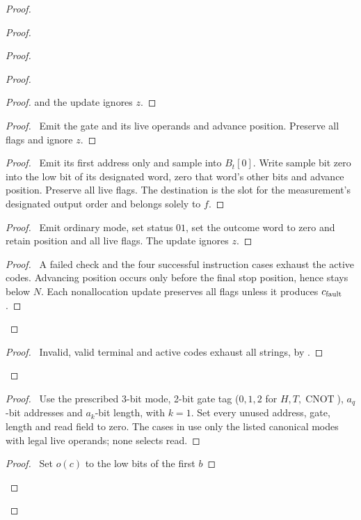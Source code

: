 \begin{proof}
\begin{proof}
\begin{proof}
\begin{proof}
\begin{proof}
   and the update ignores $z$.\end{proof}
   \begin{proof}\pf\ Emit the gate and its live operands and
   advance position. Preserve all flags and ignore $z$.\end{proof}
   \begin{proof}\pf\ Emit its first address only and sample into
   $B_t[0]$. Write sample bit zero into the low bit of its designated
   word, zero that word's other bits and advance position. Preserve
   all live flags. The destination is the slot for the measurement's
   designated output order and belongs solely to $f$.\end{proof}
   \begin{proof}\pf\ Emit ordinary mode, set status $01$, set the
   outcome word to zero and retain position and all live flags.
   The update ignores $z$.\end{proof}
   \qedstep
   \begin{proof}\pf\ A failed check and the four successful
   instruction cases exhaust the active codes. Advancing position
   occurs only before the final stop position, hence stays below $N$.
   Each nonallocation update preserves all flags unless it produces
   $c_{\rm fault}$.\end{proof}
  \end{proof}
  \qedstep
  \begin{proof}\pf\ Invalid, valid terminal and active codes exhaust
  all strings, by .\end{proof}
 \end{proof}
 \begin{proof}\pf\ Use the prescribed 3-bit mode, 2-bit gate tag
 ($0,1,2$ for $H,T,\operatorname{CNOT}$), $a_q$-bit addresses
 and $a_k$-bit length, with $k=1$. Set every unused address, gate,
 length and read field to zero. The cases in
  use only the listed canonical modes
 with legal live operands; none selects read.\end{proof}
 \begin{proof}\pf\ Set $o(c)$ to the low bits of the first $b$

\end{proof}
\end{proof}
\end{proof}

